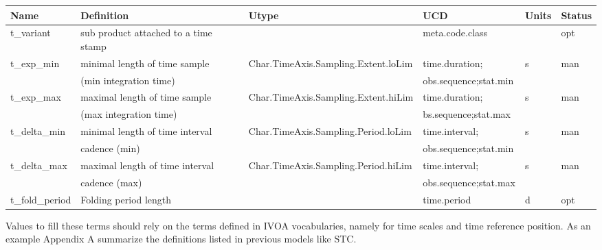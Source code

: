 \documentclass[11pt,a4paper]{ivoa}
\begin{document}
\begin{table}
\begin{small}
\begin{tabular}{|l|l|l|l|l|l|l|}
 \end{tabular}
 \bigskip
\begin{tabular}{|l|l|l|l|l|l|}
 \hline
\bf{Name}   &	\bf{Definition} & \bf{Utype}&	\bf{UCD}	&\bf{Units}&	\bf{Status} \\ \hline
%
%
\hline
{\color{blue} t\_variant } & sub product attached to a time stamp &  & meta.code.class &  & opt\\ \hline
{\color{blue} t\_exp\_min} & minimal length of time sample & Char.TimeAxis.Sampling.Extent.loLim & time.duration; & s & man\\ 
&  (min integration time)& & obs.sequence;stat.min& & \\ \hline
{\color{blue}t\_exp\_max} & maximal length of time sample  & Char.TimeAxis.Sampling.Extent.hiLim & time.duration; & s & man\\ 
& (max integration time) & &bs.sequence;stat.max & & \\ \hline
{\color{blue}t\_delta\_min} & minimal length of time interval & Char.TimeAxis.Sampling.Period.loLim & time.interval; & s & man \\ 
& cadence (min)& &obs.sequence;stat.min  & &   \\ \hline
{\color{blue}t\_delta\_max} & maximal length of time interval & Char.TimeAxis.Sampling.Period.hiLim & time.interval;& s & man\\ 
& cadence (max)& & obs.sequence;stat.max& &  \\ \hline
{\color{blue} t\_fold\_period}& Folding period length &  & time.period&d & opt  \\ \hline
 \end{tabular}

  \end{small}
 \end{table} 
 
 
Values to fill these terms should rely on the terms defined in IVOA vocabularies, namely for  time scales and time reference position. 
As an example Appendix A summarize the definitions listed in previous models like STC.
 
\end{document}
